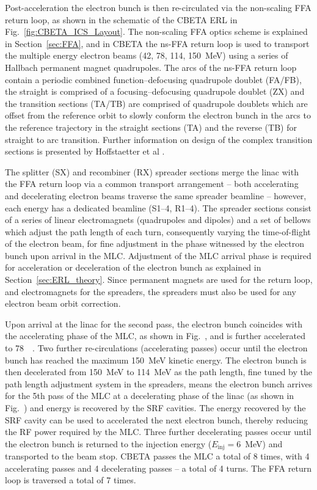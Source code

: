 \documentclass[../main.tex]{subfiles}
\begin{document}
Post-acceleration the electron bunch is then re-circulated via the non-scaling FFA return loop, as shown in the schematic of the CBETA ERL in Fig.~\ref{fig:CBETA_ICS_Layout}. The non-scaling FFA optics scheme is explained in Section~\ref{sec:FFA}, and in CBETA the ns-FFA return loop is used to transport the multiple energy electron beams (42, 78, 114, 150~\si{\mega\electronvolt}) using a series of Hallbach permanent magnet quadrupoles. The arcs of the ns-FFA return loop contain a periodic combined function--defocusing quadrupole doublet (FA/FB), the straight is comprised of a focusing--defocusing quadrupole doublet (ZX) and the transition sections (TA/TB) are comprised of quadrupole doublets which are offset from the reference orbit to slowly conform the electron bunch in the arcs to the reference trajectory in the straight sections (TA) and the reverse (TB) for straight to arc transition. Further information on design of the complex transition sections is presented by Hoffstaetter et al \cite{hoffstaetter2017cbeta}.  

The splitter (SX) and recombiner (RX) spreader sections merge the linac with the FFA return loop via a common transport arrangement -- both accelerating and decelerating electron beams traverse the same spreader beamline -- however, each energy has a dedicated beamline (S1--4, R1--4). The spreader sections consist of a series of linear electromagnets (quadrupoles and dipoles) and a set of bellows which adjust the path length of each turn, consequently varying the time-of-flight of the electron beam, for fine adjustment in the phase witnessed by the electron bunch upon arrival in the MLC. Adjustment of the MLC arrival phase is required for acceleration or deceleration of the electron bunch as explained in Section~\ref{sec:ERL_theory}. Since permanent magnets are used for the return loop, and electromagnets for the spreaders, the spreaders must also be used for any electron beam orbit correction.

Upon arrival at the linac for the second pass, the electron bunch coincides with the accelerating phase of the MLC, as shown in Fig.~, and is further accelerated to 78~\si{\mega\electronvolts}. Two further re-circulations (accelerating passes) occur until the electron bunch has reached the maximum 150~\si{\mega\electronvolt} kinetic energy. The electron bunch is then decelerated from 150~\si{\mega\electronvolt} to 114~\si{\mega\electronvolt} as the path length, fine tuned by the path length adjustment system in the spreaders, means the electron bunch arrives for the 5th pass of the MLC at a decelerating phase of the linac (as shown in Fig.~) and energy is recovered by the SRF cavities. The energy recovered by the SRF cavity can be used to accelerated the next electron bunch, thereby reducing the RF power required by the MLC. Three further decelerating passes occur until the electron bunch is returned to the injection energy ($E_{\mathrm{inj}} = 6$~\si{\mega\electronvolt}) and transported to the beam stop. CBETA passes the MLC a total of 8 times, with 4 accelerating passes and 4 decelerating passes -- a total of 4 turns. The FFA return loop is traversed a total of 7 times.
\end{document}
